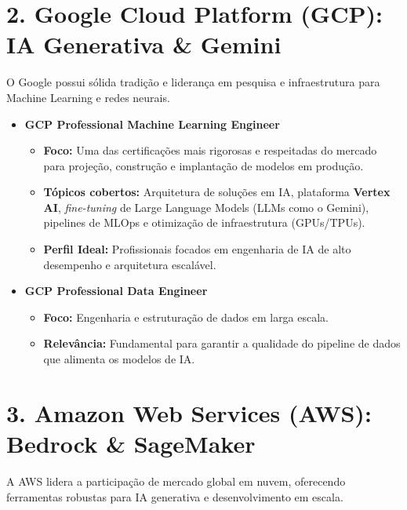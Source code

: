 \documentclass[11pt, a4paper]{article}
\begin{document}
\vspace{1em}

\section*{\color{primary}2. Google Cloud Platform (GCP): IA Generativa \& Gemini}
O Google possui sólida tradição e liderança em pesquisa e infraestrutura para Machine Learning e redes neurais.

\begin{itemize}
    \item \textbf{GCP Professional Machine Learning Engineer}
    \begin{itemize}
        \item \textbf{Foco:} Uma das certificações mais rigorosas e respeitadas do mercado para projeção, construção e implantação de modelos em produção.
        \item \textbf{Tópicos cobertos:} Arquitetura de soluções em IA, plataforma \textbf{Vertex AI}, \textit{fine-tuning} de Large Language Models (LLMs como o Gemini), pipelines de MLOps e otimização de infraestrutura (GPUs/TPUs).
        \item \textbf{Perfil Ideal:} Profissionais focados em engenharia de IA de alto desempenho e arquitetura escalável.
    \end{itemize}

    \item \textbf{GCP Professional Data Engineer}
    \begin{itemize}
        \item \textbf{Foco:} Engenharia e estruturação de dados em larga escala.
        \item \textbf{Relevância:} Fundamental para garantir a qualidade do pipeline de dados que alimenta os modelos de IA.
    \end{itemize}
\end{itemize}

\newpage

\section*{\color{primary}3. Amazon Web Services (AWS): Bedrock \& SageMaker}
A AWS lidera a participação de mercado global em nuvem, oferecendo ferramentas robustas para IA generativa e desenvolvimento em escala.
\end{document}

